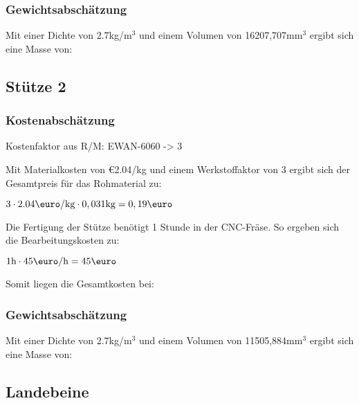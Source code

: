\documentclass[10pt, a4paper]{article}
\begin{document}
\subsubsection{Gewichtsabschätzung}
Mit einer Dichte von 2.7kg/m$^3$ und einem Volumen von 16207,707mm$^3$ ergibt sich eine Masse von:
\begin{flushright}
\end{flushright}

\newpage
\subsection{Stütze 2}
\begin{figure}[h]
  \centering
  \vspace{-10pt}
\end{figure}
\subsubsection{Kostenabschätzung}
\begin{center}
  Kostenfaktor aus R/M: EWAN-6060 -> 3
\end{center}
Mit Materialkosten von \euro2.04/kg und einem Werkstoffaktor von 3 ergibt sich der Gesamtpreis für das Rohmaterial zu: 
\begin{center}
    $3 \cdot 2.04\text{\euro/kg} \cdot 0,031\text{kg} = 0,19\text{\euro}$
\end{center}
Die Fertigung der Stütze benötigt 1 Stunde in der CNC-Fräse. So ergeben sich die Bearbeitungskosten zu:
\begin{center}
  $1\text{h} \cdot 45\text{\euro/h}= 45\text{\euro}$
\end{center}
Somit liegen die Gesamtkosten bei:
\begin{flushright}
\end{flushright}
\subsubsection{Gewichtsabschätzung}
Mit einer Dichte von 2.7kg/m$^3$ und einem Volumen von 11505,884mm$^3$ ergibt sich eine Masse von:
\begin{flushright}
\end{flushright}

\newpage
\subsection{Landebeine}
\begin{figure}[h]
  \centering
  \vspace{-10pt}
\end{figure}
\end{document}
